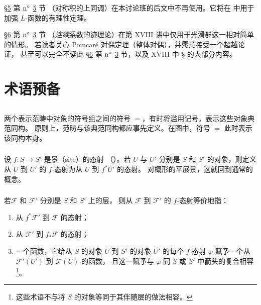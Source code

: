 \S \hyperref[XVII.sec5]{5} 第 ${\rm n^{\circ}}$ \hyperref[XVII.subsec5.5]{5} 节
（对称积的上同调）在本讨论班的后文中不再使用。它将在  中用于加强
$L$-函数的有理性定理。

\S \hyperref[XVII.sec6]{6} 第 ${\rm n^{\circ}}$ \hyperref[XVII.subsec6.3]{3} 节
（\emph{连续}系数的迹理论）在第 XVIII 讲中仅用于光滑群这一相对简单的情形。
若读者关心 Poincaré 对偶定理（整体对偶），并愿意接受一个超越论证，
甚至可以完全不读此 \S \hyperref[XVII.sec6]{6} 第 ${\rm n^{\circ}}$
\hyperref[XVII.subsec6.3]{3} 节，以及 XVIII 中 \S {} 的大部分内容。

\setcounter{section}{-1}
\section{术语预备}

\subsection{}
两个表示范畴中对象的符号组之间的符号 $=$，有时将滥用记号，表示这些对象典范同构。
原则上，范畴与该典范同构都应事先定义。在图中，符号 $=$ 此时表示该同构本身。

\hypertarget{sga4.exp.XVII.subsection.0.2}{}\setcounter{subsection}{2}
\setcounter{subsubsection}{-1}
\subsubsection{}
设 $f:S\rightarrow S'$ 是景（site）的态射
（）。若 $U$ 与 $U'$ 分别是 $S$ 和 $S'$
的对象，则定义从 $U$ 到 $U'$ 的 $f$-态射为从 $U$ 到 $f^{\ast}U'$ 的态射。
对概形的平展景，这就回到通常的概念。

\subsubsection{}
若\pageoriginale $\mathcal{F}$ 和 $\mathcal{F}'$ 分别是 $S$ 和 $S'$ 上的层，
则从 $\mathcal{F}$ 到 $\mathcal{F}'$ 的 $f$-态射等价地指：
\begin{enumerate}
\renewcommand{\theenumi}{\roman{enumi}}
\renewcommand{\labelenumi}{(\theenumi)}
\item 从 $f^{\ast}\mathcal{F}'$ 到 $\mathcal{F}$ 的态射；

\item 从 $\mathcal{F}'$ 到 $f_{\ast}\mathcal{F}$ 的态射；

\item 一个函数，它给从 $S$ 的对象 $U$ 到 $S'$ 的对象 $U'$ 的每个 $f$-态射
  $\varphi$ 赋予一个从 $\mathcal{F}'(U')$ 到 $\mathcal{F}(U)$ 的函数，
  且这一赋予与 $\varphi$ 同 $S$ 或 $S'$ 中箭头的复合相容
  \footnote{这些术语不与将 $S$ 的对象等同于其伴随层的做法相容。}。
\end{enumerate}

